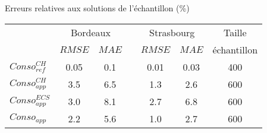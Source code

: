 \documentclass[xcolor=x11names, compress, 11pt]{beamer}
\begin{document}
\begin{frame}[c]
    \vfill
    \begin{table}
    \centering
    Erreurs relatives aux solutions de l’échantillon (\si{\percent})
    \vfill
    \begin{tabular}{l c c c c c c}
        \toprule
                        & \multicolumn{2}{c}{Bordeaux} & & \multicolumn{2}{c}{Strasbourg} &
                          Taille \\
                        \cmidrule(r){2-3}
                        \cmidrule(r){5-6}
                        & $RMSE$ & $MAE$   &       & $RMSE$ & $MAE$ & échantillon \\
        \midrule
        $Conso_{ref}^{CH}$  & \num{0.05}  & \num{0.1}  &  & \num{0.01}   & \num{0.03}  & \num{400}  \\
        \addlinespace[\defaultaddspace]
        $Conso_{app}^{CH}$  & \num{3.5}  & \num{6.5} &  & \num{1.3}   & \num{2.6}  & \num{600} \\
        \addlinespace[\defaultaddspace]
        $Conso_{app}^{ECS}$ & \num{3.0} & \num{8.1} & & \num{2.7}   & \num{6.8}  & \num{600} \\
        \addlinespace[\defaultaddspace]
        $Conso_{app}$       & \num{2.2} & \num{5.6} & & \num{1.0}   & \num{2.7}  & \num{600} \\
        \bottomrule
    \end{tabular}
    \end{table}
    \vfill
\end{frame}



\end{document}
